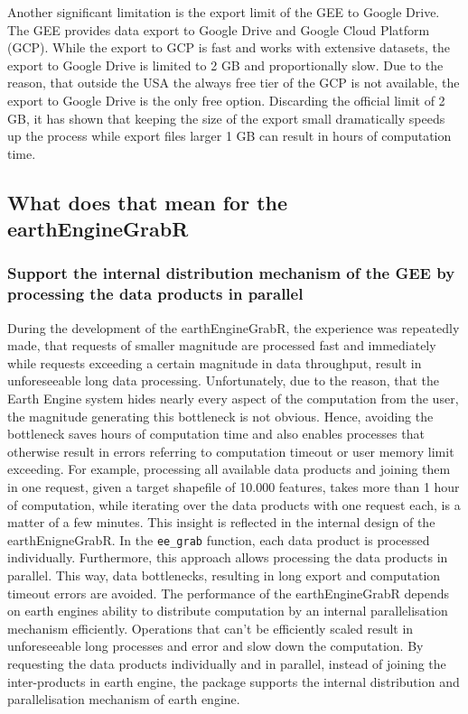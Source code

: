 Another significant limitation is the export limit of the GEE to Google Drive.
The GEE provides data export to Google Drive and Google Cloud Platform (GCP). While the export to GCP is fast and works with extensive datasets, the export to Google Drive is limited to 2 GB and proportionally slow. Due to the reason, that outside the USA the always free tier of the GCP is not available, the export to Google Drive is the only free option. Discarding the official limit of 2 GB, it has shown that keeping the size of the export small dramatically speeds up the process while export files larger 1 GB can result in hours of computation time. 

\subsection{What does that mean for the earthEngineGrabR}

\subsubsection{Support the internal distribution mechanism of the GEE by processing the data products in parallel}

During the development of the earthEngineGrabR, the experience was repeatedly made, that requests of smaller magnitude are processed fast and immediately while requests exceeding a certain magnitude in data throughput, result in unforeseeable long data processing. Unfortunately, due to the reason, that the Earth Engine system hides nearly every aspect of the computation from the user, the magnitude generating this bottleneck is not obvious. Hence, avoiding the bottleneck saves hours of computation time and also enables processes that otherwise result in errors referring to computation timeout or user memory limit exceeding. For example, processing all available data products and joining them in one request, given a target shapefile of 10.000 features, takes more than 1 hour of computation, while iterating over the data products with one request each, is a matter of a few minutes. This insight is reflected in the internal design of the earthEnigneGrabR. In the \texttt{ee\_grab} function, each data product is processed individually. Furthermore, this approach allows processing the data products in parallel. This way, data bottlenecks, resulting in long export and computation timeout errors are avoided. The performance of the earthEngineGrabR depends on earth engines ability to distribute computation by an internal parallelisation mechanism efficiently. Operations that can't be efficiently scaled result in unforeseeable long processes and error and slow down the computation. By requesting the data products individually and in parallel, instead of joining the inter-products in earth engine, the package supports the internal distribution and parallelisation mechanism of earth engine.


